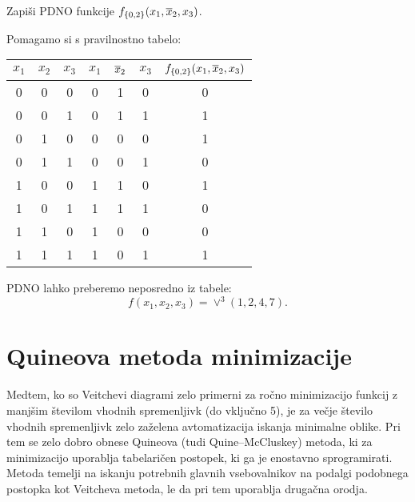 \bigskip
\begin{zgled} 
Zapiši PDNO funkcije $f_{\{0,2\}}(x_1,\overline x_2,x_3)$.
\end{zgled}
\begin{resitev}
Pomagamo si s pravilnostno tabelo:

\begin{tabular}{ccc|ccc|c}
$x_1$ & $x_2$ & $x_3$ & $x_1$ & $\overline x_2$ & $x_3$ & $f_{\{0,2\}}(x_1,\overline x_2,x_3)$ \\
\hline
0 & 0 & 0 & 0 & 1 & 0 & 0 \\
0 & 0 & 1 & 0 & 1 & 1 & 1 \\
0 & 1 & 0 & 0 & 0 & 0 & 1 \\
0 & 1 & 1 & 0 & 0 & 1 & 0 \\
1 & 0 & 0 & 1 & 1 & 0 & 1 \\
1 & 0 & 1 & 1 & 1 & 1 & 0 \\
1 & 1 & 0 & 1 & 0 & 0 & 0 \\
1 & 1 & 1 & 1 & 0 & 1 & 1 \\
\end{tabular}

PDNO lahko preberemo neposredno iz tabele:
$$f(x_1,x_2,x_3) = \vee^3(1,2,4,7).$$
\end{resitev}


\section{Quineova metoda minimizacije}
Medtem, ko so Veitchevi diagrami zelo primerni za ročno minimizacijo funkcij z manjšim številom vhodnih spremenljivk (do vključno 5), je za večje število vhodnih spremenljivk zelo zaželena avtomatizacija iskanja minimalne oblike. Pri tem se zelo dobro obnese Quineova (tudi Quine–McCluskey) metoda, ki za minimizacijo uporablja tabelaričen postopek, ki ga je enostavno sprogramirati. Metoda temelji na iskanju potrebnih glavnih vsebovalnikov na podalgi podobnega postopka kot Veitcheva metoda, le da pri tem uporablja drugačna orodja.


